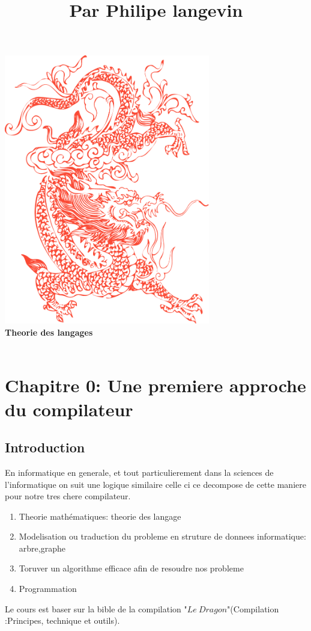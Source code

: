 \documentclass[a4paper,11pt]{article}
\title{\color{OrangeHaf} Par Philipe langevin}
\date{}
\begin{document}
\pagecolor{BlackHaf}
     \begin{center}
     \hfill\includegraphics[width=9cm]{dragon.png}\hspace*{\fill}
     \\
     \textbf{\color{OrangeHaf}\huge Theorie des langages}\\
     \\
     \end{center}
     \tableofcontents
    \section{\color{OrangeHaf} Chapitre 0: Une premiere approche du compilateur}
     \subsection{Introduction}
        En informatique en generale, et tout particulierement dans la sciences de l'informatique
        on suit une logique similaire celle ci ce decompose de cette maniere pour notre tres chere compilateur.
        \begin{enumerate}
            \item Theorie mathématiques: theorie des langage
            \item Modelisation ou traduction du probleme en struture de donnees informatique: arbre,graphe
            \item Toruver un algorithme efficace afin de resoudre nos probleme
            \item Programmation
        \end{enumerate}
        Le cours est baser sur la bible de la compilation "$Le\ Dragon$"(Compilation :Principes, technique et outils).
\end{document}
